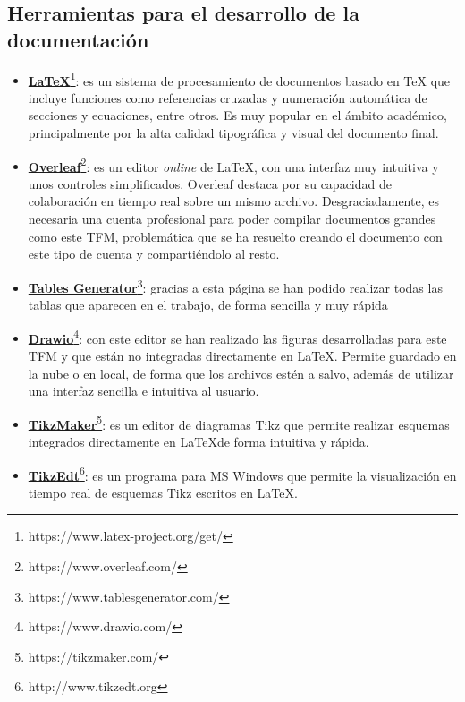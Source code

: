 \subsection{Herramientas para el desarrollo de la documentación}

\begin{itemize}
    \item \textbf{\href{https://www.latex-project.org/get/}{\LaTeX}}\footnote{https://www.latex-project.org/get/}: es un sistema de procesamiento de documentos basado en TeX que incluye funciones como referencias cruzadas y numeración automática de secciones y ecuaciones, entre otros. Es muy popular en el ámbito académico, principalmente por la alta calidad tipográfica y visual del documento final.
    
    \item \textbf{\href{https://www.overleaf.com/}{Overleaf}}\footnote{https://www.overleaf.com/}: es un editor \textit{online} de \LaTeX, con una interfaz muy intuitiva y unos controles simplificados. Overleaf destaca por su capacidad de colaboración en tiempo real sobre un mismo archivo. Desgraciadamente, es necesaria una cuenta profesional para poder compilar documentos grandes como este TFM, problemática que se ha resuelto creando el documento con este tipo de cuenta y compartiéndolo al resto.
    
    \item \textbf{\href{https://www.tablesgenerator.com/}{Tables Generator}}\footnote{https://www.tablesgenerator.com/}: gracias a esta página se han podido realizar todas las tablas que aparecen en el trabajo, de forma sencilla y muy rápida

    \item \textbf{\href{https://www.drawio.com/}{Drawio}}\footnote{https://www.drawio.com/}: con este editor se han realizado las figuras desarrolladas para este TFM y que  están no integradas directamente en \LaTeX. Permite guardado en la nube o en local, de forma que los archivos estén a salvo, además de utilizar una interfaz sencilla e intuitiva al usuario.
    
    \item \textbf{\href{https://tikzmaker.com/}{TikzMaker}}\footnote{https://tikzmaker.com/}: es un editor de diagramas Tikz que permite realizar esquemas integrados directamente en \LaTeX de forma intuitiva y rápida.

    \item \textbf{\href{http://www.tikzedt.org}{TikzEdt}}\footnote{http://www.tikzedt.org}: es un programa para \ac{MS} Windows que permite la visualización en tiempo real de esquemas Tikz escritos en \LaTeX.
\end{itemize}
